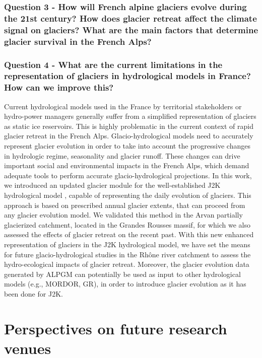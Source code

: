 \subsubsection{Question 3 - How will French alpine glaciers evolve during the 21st century? How does glacier retreat affect the climate signal on glaciers? What are the main factors that determine glacier survival in the French Alps?}

\blindtext

\subsubsection{Question 4 - What are the current limitations in the representation of glaciers in hydrological models in France? How can we improve this?}

Current hydrological models used in the France by territorial stakeholders or hydro-power managers generally suffer from a simplified representation of glaciers as static ice reservoirs. This is highly problematic in the current context of rapid glacier retreat in the French Alps. Glacio-hydrological models need to accurately represent glacier evolution in order to take into account the progressive changes in hydrologic regime, seasonality and glacier runoff. These changes can drive important social and environmental impacts in the French Alps, which demand adequate tools to perform accurate glacio-hydrological projections. In this work, we introduced an updated glacier module for the well-established J2K hydrological model \citep{krause_quantifying_2002}, capable of representing the daily evolution of glaciers. This approach is based on prescribed annual glacier extents, that can proceed from any glacier evolution model. We validated this method in the Arvan partially glacierized catchment, located in the Grandes Rousses massif, for which we also assessed the effects of glacier retreat on the recent past. With this new enhanced representation of glaciers in the J2K hydrological model, we have set the means for future glacio-hydrological studies in the Rhône river catchment to assess the hydro-ecological impacts of glacier retreat. Moreover, the glacier evolution data generated by ALPGM can potentially be used as input to other hydrological models (e.g., MORDOR, GR), in order to introduce glacier evolution as it has been done for J2K.

\section{Perspectives on future research venues}

